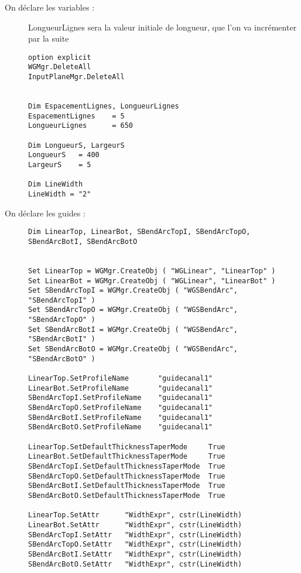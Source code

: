 
\begin{description}
    \item[On déclare les variables :] LongueurLignes sera la valeur initiale de longueur, que l'on va incrémenter par la suite
\begin{lstlisting}[style=Common]
option explicit
WGMgr.DeleteAll
InputPlaneMgr.DeleteAll


Dim EspacementLignes, LongueurLignes
EspacementLignes    = 5
LongueurLignes      = 650

Dim LongueurS, LargeurS
LongueurS   = 400
LargeurS    = 5

Dim LineWidth
LineWidth = "2"
\end{lstlisting}


    \item[On déclare les guides :]
\begin{lstlisting}[style=Common]
Dim LinearTop, LinearBot, SBendArcTopI, SBendArcTopO, SBendArcBotI, SBendArcBotO


Set LinearTop = WGMgr.CreateObj ( "WGLinear", "LinearTop" )
Set LinearBot = WGMgr.CreateObj ( "WGLinear", "LinearBot" )
Set SBendArcTopI = WGMgr.CreateObj ( "WGSBendArc", "SBendArcTopI" )
Set SBendArcTopO = WGMgr.CreateObj ( "WGSBendArc", "SBendArcTopO" )
Set SBendArcBotI = WGMgr.CreateObj ( "WGSBendArc", "SBendArcBotI" )
Set SBendArcBotO = WGMgr.CreateObj ( "WGSBendArc", "SBendArcBotO" )

LinearTop.SetProfileName       "guidecanal1"
LinearBot.SetProfileName       "guidecanal1"
SBendArcTopI.SetProfileName    "guidecanal1"
SBendArcTopO.SetProfileName    "guidecanal1"
SBendArcBotI.SetProfileName    "guidecanal1"
SBendArcBotO.SetProfileName    "guidecanal1"

LinearTop.SetDefaultThicknessTaperMode     True
LinearBot.SetDefaultThicknessTaperMode     True
SBendArcTopI.SetDefaultThicknessTaperMode  True
SBendArcTopO.SetDefaultThicknessTaperMode  True
SBendArcBotI.SetDefaultThicknessTaperMode  True
SBendArcBotO.SetDefaultThicknessTaperMode  True

LinearTop.SetAttr      "WidthExpr", cstr(LineWidth)
LinearBot.SetAttr      "WidthExpr", cstr(LineWidth)
SBendArcTopI.SetAttr   "WidthExpr", cstr(LineWidth)
SBendArcTopO.SetAttr   "WidthExpr", cstr(LineWidth)
SBendArcBotI.SetAttr   "WidthExpr", cstr(LineWidth)
SBendArcBotO.SetAttr   "WidthExpr", cstr(LineWidth)
\end{lstlisting}



\end{description}
